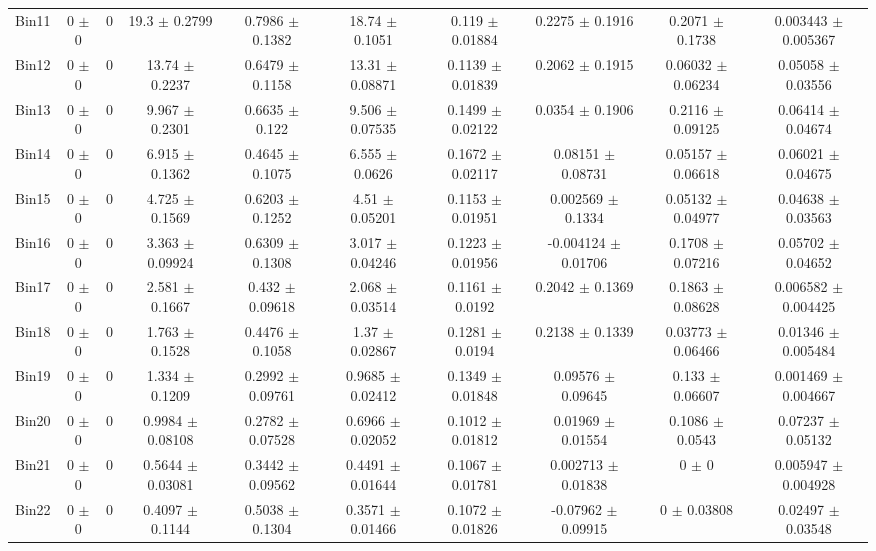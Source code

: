 \begin{tabular}{@{\extracolsep{4pt}}lccccccccc@{}}
     Bin11 & 0 $\pm$ 0 & 0 & 19.3 $\pm$ 0.2799 & 0.7986 $\pm$ 0.1382 & 18.74 $\pm$ 0.1051 & 0.119 $\pm$ 0.01884 & 0.2275 $\pm$ 0.1916 & 0.2071 $\pm$ 0.1738 & 0.003443 $\pm$ 0.005367 \\ 
     Bin12 & 0 $\pm$ 0 & 0 & 13.74 $\pm$ 0.2237 & 0.6479 $\pm$ 0.1158 & 13.31 $\pm$ 0.08871 & 0.1139 $\pm$ 0.01839 & 0.2062 $\pm$ 0.1915 & 0.06032 $\pm$ 0.06234 & 0.05058 $\pm$ 0.03556 \\ 
     Bin13 & 0 $\pm$ 0 & 0 & 9.967 $\pm$ 0.2301 & 0.6635 $\pm$ 0.122 & 9.506 $\pm$ 0.07535 & 0.1499 $\pm$ 0.02122 & 0.0354 $\pm$ 0.1906 & 0.2116 $\pm$ 0.09125 & 0.06414 $\pm$ 0.04674 \\ 
     Bin14 & 0 $\pm$ 0 & 0 & 6.915 $\pm$ 0.1362 & 0.4645 $\pm$ 0.1075 & 6.555 $\pm$ 0.0626 & 0.1672 $\pm$ 0.02117 & 0.08151 $\pm$ 0.08731 & 0.05157 $\pm$ 0.06618 & 0.06021 $\pm$ 0.04675 \\ 
     Bin15 & 0 $\pm$ 0 & 0 & 4.725 $\pm$ 0.1569 & 0.6203 $\pm$ 0.1252 & 4.51 $\pm$ 0.05201 & 0.1153 $\pm$ 0.01951 & 0.002569 $\pm$ 0.1334 & 0.05132 $\pm$ 0.04977 & 0.04638 $\pm$ 0.03563 \\ 
     Bin16 & 0 $\pm$ 0 & 0 & 3.363 $\pm$ 0.09924 & 0.6309 $\pm$ 0.1308 & 3.017 $\pm$ 0.04246 & 0.1223 $\pm$ 0.01956 & -0.004124 $\pm$ 0.01706 & 0.1708 $\pm$ 0.07216 & 0.05702 $\pm$ 0.04652 \\ 
     Bin17 & 0 $\pm$ 0 & 0 & 2.581 $\pm$ 0.1667 & 0.432 $\pm$ 0.09618 & 2.068 $\pm$ 0.03514 & 0.1161 $\pm$ 0.0192 & 0.2042 $\pm$ 0.1369 & 0.1863 $\pm$ 0.08628 & 0.006582 $\pm$ 0.004425 \\ 
     Bin18 & 0 $\pm$ 0 & 0 & 1.763 $\pm$ 0.1528 & 0.4476 $\pm$ 0.1058 & 1.37 $\pm$ 0.02867 & 0.1281 $\pm$ 0.0194 & 0.2138 $\pm$ 0.1339 & 0.03773 $\pm$ 0.06466 & 0.01346 $\pm$ 0.005484 \\ 
     Bin19 & 0 $\pm$ 0 & 0 & 1.334 $\pm$ 0.1209 & 0.2992 $\pm$ 0.09761 & 0.9685 $\pm$ 0.02412 & 0.1349 $\pm$ 0.01848 & 0.09576 $\pm$ 0.09645 & 0.133 $\pm$ 0.06607 & 0.001469 $\pm$ 0.004667 \\ 
     Bin20 & 0 $\pm$ 0 & 0 & 0.9984 $\pm$ 0.08108 & 0.2782 $\pm$ 0.07528 & 0.6966 $\pm$ 0.02052 & 0.1012 $\pm$ 0.01812 & 0.01969 $\pm$ 0.01554 & 0.1086 $\pm$ 0.0543 & 0.07237 $\pm$ 0.05132 \\ 
     Bin21 & 0 $\pm$ 0 & 0 & 0.5644 $\pm$ 0.03081 & 0.3442 $\pm$ 0.09562 & 0.4491 $\pm$ 0.01644 & 0.1067 $\pm$ 0.01781 & 0.002713 $\pm$ 0.01838 & 0 $\pm$ 0 & 0.005947 $\pm$ 0.004928 \\ 
     Bin22 & 0 $\pm$ 0 & 0 & 0.4097 $\pm$ 0.1144 & 0.5038 $\pm$ 0.1304 & 0.3571 $\pm$ 0.01466 & 0.1072 $\pm$ 0.01826 & -0.07962 $\pm$ 0.09915 & 0 $\pm$ 0.03808 & 0.02497 $\pm$ 0.03548 \\ 

\end{tabular}
